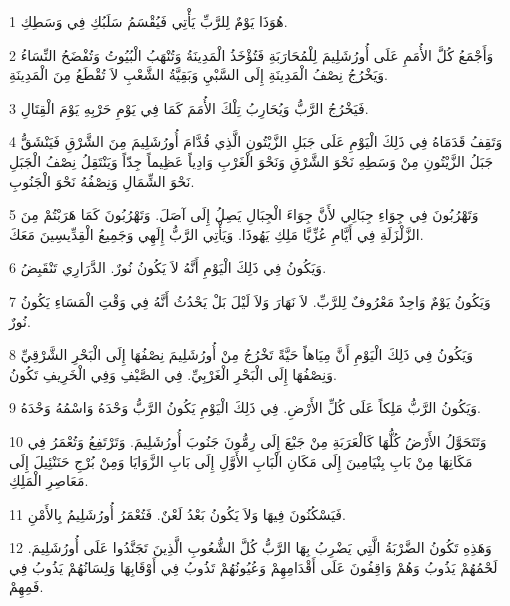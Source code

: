 \par 1 هُوَذَا يَوْمٌ لِلرَّبِّ يَأْتِي فَيُقْسَمُ سَلَبُكِ فِي وَسَطِكِ.
\par 2 وَأَجْمَعُ كُلَّ الأُمَمِ عَلَى أُورُشَلِيمَ لِلْمُحَارَبَةِ فَتُؤْخَذُ الْمَدِينَةُ وَتُنْهَبُ الْبُيُوتُ وَتُفْضَحُ النِّسَاءُ وَيَخْرُجُ نِصْفُ الْمَدِينَةِ إِلَى السَّبْيِ وَبَقِيَّةُ الشَّعْبِ لاَ تُقْطَعُ مِنَ الْمَدِينَةِ.
\par 3 فَيَخْرُجُ الرَّبُّ وَيُحَارِبُ تِلْكَ الأُمَمَ كَمَا فِي يَوْمِ حَرْبِهِ يَوْمَ الْقِتَالِ.
\par 4 وَتَقِفُ قَدَمَاهُ فِي ذَلِكَ الْيَوْمِ عَلَى جَبَلِ الزَّيْتُونِ الَّذِي قُدَّامَ أُورُشَلِيمَ مِنَ الشَّرْقِ فَيَنْشَقُّ جَبَلُ الزَّيْتُونِ مِنْ وَسَطِهِ نَحْوَ الشَّرْقِ وَنَحْوَ الْغَرْبِ وَادِياً عَظِيماً جِدّاً وَيَنْتَقِلُ نِصْفُ الْجَبَلِ نَحْوَ الشِّمَالِ وَنِصْفُهُ نَحْوَ الْجَنُوبِ.
\par 5 وَتَهْرُبُونَ فِي جِوَاءِ جِبَالِي لأَنَّ جِوَاءَ الْجِبَالِ يَصِلُ إِلَى آصَلَ. وَتَهْرُبُونَ كَمَا هَرَبْتُمْ مِنَ الزَّلْزَلَةِ فِي أَيَّامِ عُزِّيَّا مَلِكِ يَهُوذَا. وَيَأْتِي الرَّبُّ إِلَهِي وَجَمِيعُ الْقِدِّيسِينَ مَعَكَ.
\par 6 وَيَكُونُ فِي ذَلِكَ الْيَوْمِ أَنَّهُ لاَ يَكُونُ نُورٌ. الدَّرَارِي تَنْقَبِضُ.
\par 7 وَيَكُونُ يَوْمٌ وَاحِدٌ مَعْرُوفٌ لِلرَّبِّ. لاَ نَهَارَ وَلاَ لَيْلَ بَلْ يَحْدُثُ أَنَّهُ فِي وَقْتِ الْمَسَاءِ يَكُونُ نُورٌ.
\par 8 وَيَكُونُ فِي ذَلِكَ الْيَوْمِ أَنَّ مِيَاهاً حَيَّةً تَخْرُجُ مِنْ أُورُشَلِيمَ نِصْفُهَا إِلَى الْبَحْرِ الشَّرْقِيِّ وَنِصْفُهَا إِلَى الْبَحْرِ الْغَرْبِيِّ. فِي الصَّيْفِ وَفِي الْخَرِيفِ تَكُونُ.
\par 9 وَيَكُونُ الرَّبُّ مَلِكاً عَلَى كُلِّ الأَرْضِ. فِي ذَلِكَ الْيَوْمِ يَكُونُ الرَّبُّ وَحْدَهُ وَاسْمُهُ وَحْدَهُ.
\par 10 وَتَتَحَوَّلُ الأَرْضُ كُلُّهَا كَالْعَرَبَةِ مِنْ جَبْعَ إِلَى رِمُّونَ جَنُوبَ أُورُشَلِيمَ. وَتَرْتَفِعُ وَتُعْمَرُ فِي مَكَانِهَا مِنْ بَابِ بِنْيَامِينَ إِلَى مَكَانِ الْبَابِ الأَوَّلِ إِلَى بَابِ الزَّوَايَا وَمِنْ بُرْجِ حَنَنْئِيلَ إِلَى مَعَاصِرِ الْمَلِكِ.
\par 11 فَيَسْكُنُونَ فِيهَا وَلاَ يَكُونُ بَعْدُ لَعْنٌ. فَتُعْمَرُ أُورُشَلِيمُ بِالأَمْنِ.
\par 12 وَهَذِهِ تَكُونُ الضَّرْبَةُ الَّتِي يَضْرِبُ بِهَا الرَّبُّ كُلَّ الشُّعُوبِ الَّذِينَ تَجَنَّدُوا عَلَى أُورُشَلِيمَ. لَحْمُهُمْ يَذُوبُ وَهُمْ وَاقِفُونَ عَلَى أَقْدَامِهِمْ وَعُيُونُهُمْ تَذُوبُ فِي أَوْقَابِهَا وَلِسَانُهُمْ يَذُوبُ فِي فَمِهِمْ.
